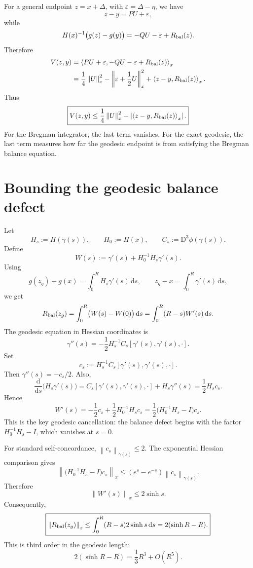 \documentclass[11pt]{article}
\newcommand{\ip}[2]{\left\langle #1,#2\right\rangle}
\newcommand{\norm}[1]{\left\lVert #1\right\rVert}
\newcommand{\D}{\mathrm D}
\newcommand{\dd}{\mathrm d}
\begin{document}
For a general endpoint $z=x+\Delta$, with $\varepsilon=\Delta-\eta$, we have
\[
    z-y=PU+\varepsilon,
\]
while
\[
    H(x)^{-1}\bigl(g(z)-g(y)\bigr)
    =-QU-\varepsilon+R_{\rm bal}(z).
\]
Therefore
\[
\begin{aligned}
    V(z,y)
    &=\ip{PU+\varepsilon}{-QU-\varepsilon+R_{\rm bal}(z)}_x \\
    &=
    \frac14\norm{U}_x^2
    -\left\|\varepsilon+\frac12U\right\|_x^2
    +\ip{z-y}{R_{\rm bal}(z)}_x.
\end{aligned}
\]
Thus
\[
    \boxed{
    V(z,y)
    \le
    \frac14\norm{U}_x^2
    +
    \left|\ip{z-y}{R_{\rm bal}(z)}_x\right|.
    }
\]
For the Bregman integrator, the last term vanishes. For the exact geodesic, the last term measures how far the geodesic endpoint is from satisfying the Bregman balance equation.

\section{Bounding the geodesic balance defect}

Let
\[
    H_s:=H(\gamma(s)),
    \qquad
    H_0:=H(x),
    \qquad
    C_s:=\D^3\phi(\gamma(s)).
\]
Define
\[
    W(s):=\gamma'(s)+H_0^{-1}H_s\gamma'(s).
\]
Using
\[
    g(z_g)-g(x)=\int_0^R H_s\gamma'(s)\,\dd s,
    \qquad
    z_g-x=\int_0^R\gamma'(s)\,\dd s,
\]
we get
\[
    R_{\rm bal}(z_g)=\int_0^R\bigl(W(s)-W(0)\bigr)\,\dd s
    =\int_0^R(R-s)W'(s)\,\dd s.
\]
The geodesic equation in Hessian coordinates is
\[
    \gamma''(s)
    =-\frac12H_s^{-1}C_s[\gamma'(s),\gamma'(s),\cdot].
\]
Set
\[
    c_s:=H_s^{-1}C_s[\gamma'(s),\gamma'(s),\cdot].
\]
Then $\gamma''(s)=-c_s/2$. Also,
\[
    \frac{\dd}{\dd s}\bigl(H_s\gamma'(s)\bigr)
    =C_s[\gamma'(s),\gamma'(s),\cdot]+H_s\gamma''(s)
    =\frac12H_sc_s.
\]
Hence
\[
    W'(s)
    =-\frac12c_s+\frac12H_0^{-1}H_sc_s
    =
    \frac12\bigl(H_0^{-1}H_s-I\bigr)c_s.
\]
This is the key geodesic cancellation: the balance defect begins with the factor $H_0^{-1}H_s-I$, which vanishes at $s=0$.

For standard self-concordance, $\norm{c_s}_{\gamma(s)}\le 2$. The exponential Hessian comparison gives
\[
    \left\|\bigl(H_0^{-1}H_s-I\bigr)c_s\right\|_x
    \le
    (e^s-e^{-s})\norm{c_s}_{\gamma(s)}.
\]
Therefore
\[
    \norm{W'(s)}_x
    \le
    2\sinh s.
\]
Consequently,
\[
    \boxed{
    \norm{R_{\rm bal}(z_g)}_x
    \le
    \int_0^R(R-s)2\sinh s\,\dd s
    =2(\sinh R-R).
    }
\]
This is third order in the geodesic length:
\[
    2(\sinh R-R)=\frac13R^3+O(R^5).
\]
\end{document}
